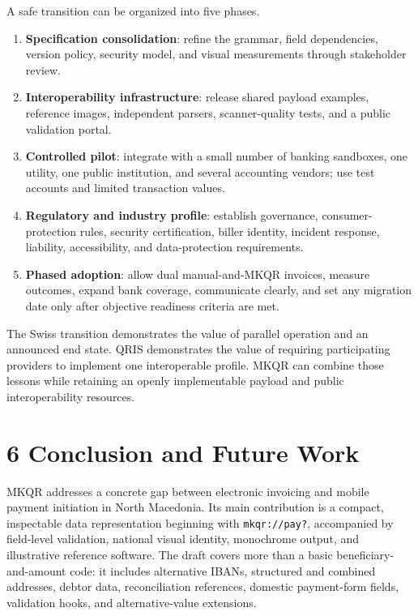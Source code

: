 A safe transition can be organized into five phases.

\begin{enumerate}
\item \textbf{Specification consolidation}: refine the grammar, field dependencies, version policy, security model, and visual measurements through stakeholder review.
\item \textbf{Interoperability infrastructure}: release shared payload examples, reference images, independent parsers, scanner-quality tests, and a public validation portal.
\item \textbf{Controlled pilot}: integrate with a small number of banking sandboxes, one utility, one public institution, and several accounting vendors; use test accounts and limited transaction values.
\item \textbf{Regulatory and industry profile}: establish governance, consumer-protection rules, security certification, biller identity, incident response, liability, accessibility, and data-protection requirements.
\item \textbf{Phased adoption}: allow dual manual-and-MKQR invoices, measure outcomes, expand bank coverage, communicate clearly, and set any migration date only after objective readiness criteria are met.
\end{enumerate}

The Swiss transition demonstrates the value of parallel operation and an announced end state. QRIS demonstrates the value of requiring participating providers to implement one interoperable profile. MKQR can combine those lessons while retaining an openly implementable payload and public interoperability resources.

\section{6 Conclusion and Future Work}

MKQR addresses a concrete gap between electronic invoicing and mobile payment initiation in North Macedonia. Its main contribution is a compact, inspectable data representation beginning with \texttt{mkqr://pay?}, accompanied by field-level validation, national visual identity, monochrome output, and illustrative reference software. The draft covers more than a basic beneficiary-and-amount code: it includes alternative IBANs, structured and combined addresses, debtor data, reconciliation references, domestic payment-form fields, validation hooks, and alternative-value extensions.

